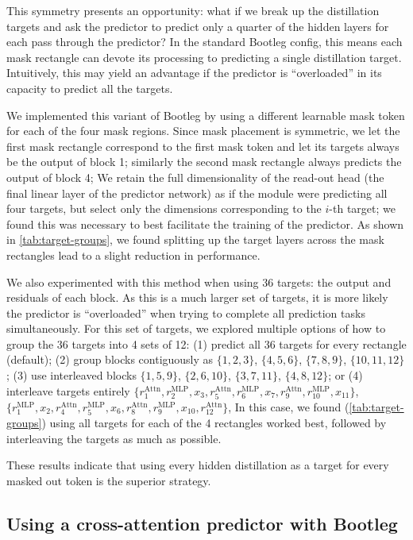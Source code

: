 This symmetry presents an opportunity: what if we break up the distillation targets and ask the predictor to predict only a quarter of the hidden layers for each pass through the predictor?
In the standard Bootleg config, this means each mask rectangle can devote its processing to predicting a single distillation target.
Intuitively, this may yield an advantage if the predictor is ``overloaded'' in its capacity to predict all the targets.

We implemented this variant of Bootleg by using a different learnable mask token for each of the four mask regions.
Since mask placement is symmetric, we let the first mask rectangle correspond to the first mask token and let its targets always be the output of block 1; similarly the second mask rectangle always predicts the output of block 4; \etc{}
We retain the full dimensionality of the read-out head (the final linear layer of the predictor network) as if the module were predicting all four targets, but select only the dimensions corresponding to the $i$-th target; we found this was necessary to best facilitate the training of the predictor.
As shown in \cref{tab:target-groups}, we found splitting up the target layers across the mask rectangles lead to a slight reduction in performance.

We also experimented with this method when using 36 targets: the output and residuals of each block.
As this is a much larger set of targets, it is more likely the predictor is ``overloaded'' when trying to complete all prediction tasks simultaneously.
For this set of targets, we explored multiple options of how to group the 36 targets into 4 sets of 12: (1) predict all 36 targets for every rectangle (default); (2) group blocks contiguously as $\{1, 2, 3\}$, $\{4, 5, 6\}$, $\{7, 8, 9\}$, $\{10, 11, 12\}$; (3) use interleaved blocks $\{1, 5, 9\}$, $\{2, 6, 10\}$, $\{3, 7, 11\}$, $\{4, 8, 12\}$; or (4) interleave targets entirely
$\{r^\text{Attn}_1, r^\text{MLP}_2, x_3, r^\text{Attn}_5, r^\text{MLP}_6, x_7, r^\text{Attn}_9, r^\text{MLP}_{10}, x_{11}\}$,
$\{r^\text{MLP}_1, x_2, r^\text{Attn}_4, r^\text{MLP}_5, x_6, r^\text{Attn}_8, r^\text{MLP}_9, x_{10}, r^\text{Attn}_{12}\}$,
\etc{}
In this case, we found (\cref{tab:target-groups}) using all targets for each of the 4 rectangles worked best, followed by interleaving the targets as much as possible.

These results indicate that using every hidden distillation as a target for every masked out token is the superior strategy.


\subsection{Using a cross-attention predictor with Bootleg}

